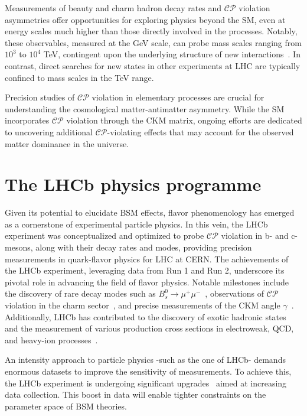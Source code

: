 Measurements of beauty and charm hadron decay rates and $\mathcal{CP}$ violation asymmetries offer opportunities for exploring physics beyond the SM, even at energy scales much higher than those directly involved in the processes. Notably, these observables, measured at the GeV scale, can probe mass scales ranging from $10^3$ to $10^4$ TeV, contingent upon the underlying structure of new interactions~\cite{Isidori_2010}. In contrast, direct searches for new states in other experiments at LHC are typically confined to mass scales in the TeV range.

Precision studies of $\mathcal{CP}$ violation in elementary processes are crucial for understanding the cosmological matter-antimatter asymmetry. While the SM incorporates $\mathcal{CP}$ violation through the CKM matrix, ongoing efforts are dedicated to uncovering additional $\mathcal{CP}$-violating effects that may account for the observed matter dominance in the universe.

\section{The LHCb physics programme}
Given its potential to elucidate BSM effects, flavor phenomenology has emerged as a cornerstone of experimental particle physics. In this vein, the LHCb experiment was conceptualized and optimized to probe $\mathcal{CP}$ violation in b- and c-mesons, along with their decay rates and modes, providing precision measurements in quark-flavor physics for LHC at CERN.
The achievements of the LHCb experiment, leveraging data from Run 1 and Run 2, underscore its pivotal role in advancing the field of flavor physics. Notable milestones include the discovery of rare decay modes such as $B^0_s\rightarrow\mu^+\mu^-$~\cite{PhysRevLett.111.101805}, observations of $\mathcal{CP}$ violation in the charm sector~\cite{Maccolini:2022y6}, and precise measurements of the CKM angle $\gamma$~\cite{Aaij_2016}. Additionally, LHCb has contributed to the discovery of exotic hadronic states~\cite{FANG202266, PhysRevLett.115.072001} and the measurement of various production cross sections in electroweak, QCD, and heavy-ion processes~\cite{ZBoson, Raab:2815873, Duan:2826531}.


An intensity approach to particle physics -such as the one of LHCb- demands enormous datasets to improve the sensitivity of measurements. To achieve this, the LHCb experiment is undergoing significant upgrades~\cite{CERN-LHCC-2021-012} aimed at increasing data collection. This boost in data will enable tighter constraints on the parameter space of BSM theories. 


